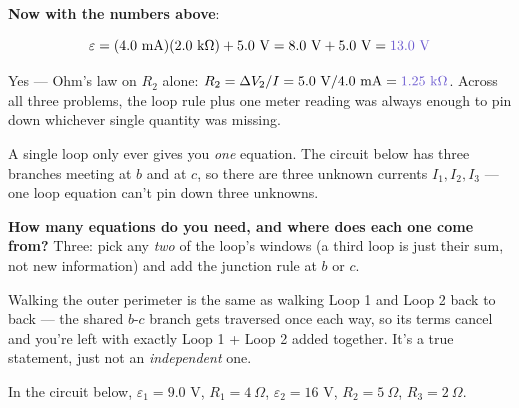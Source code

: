 \documentclass[12pt]{article}
\newcommand{\ANS}[1]{\textcolor{accent}{#1}}
\newcommand{\reszig}[1]{%
  \fill[white] ($(#1)+(-0.65,-0.32)$) rectangle ($(#1)+(0.65,0.32)$);
  \draw ($(#1)+(-0.6,0)$)
    -- ($(#1)+(-0.42,0.22)$) -- ($(#1)+(-0.24,-0.22)$)
    -- ($(#1)+(-0.06,0.22)$) -- ($(#1)+(0.12,-0.22)$)
    -- ($(#1)+(0.3,0.22)$) -- ($(#1)+(0.48,-0.22)$)
    -- ($(#1)+(0.6,0)$);
}
\newcommand{\batthL}[1]{%
  \draw[line width=0.7pt] ($(#1)+(-0.55,0)$) -- ($(#1)+(-0.12,0)$);
  \draw[line width=0.7pt] ($(#1)+(0.12,0)$) -- ($(#1)+(0.55,0)$);
  \draw[line width=1.1pt] ($(#1)+(-0.12,-0.35)$) -- ($(#1)+(-0.12,0.35)$);
  \draw[line width=2.4pt] ($(#1)+(0.12,-0.2)$) -- ($(#1)+(0.12,0.2)$);
  \node[scale=0.75] at ($(#1)+(-0.12,0.55)$) {$+$};
  \node[scale=0.75] at ($(#1)+(0.12,0.55)$) {$-$};
}
\newcommand{\batthR}[1]{%
  \draw[line width=0.7pt] ($(#1)+(-0.55,0)$) -- ($(#1)+(-0.12,0)$);
  \draw[line width=0.7pt] ($(#1)+(0.12,0)$) -- ($(#1)+(0.55,0)$);
  \draw[line width=2.4pt] ($(#1)+(-0.12,-0.2)$) -- ($(#1)+(-0.12,0.2)$);
  \draw[line width=1.1pt] ($(#1)+(0.12,-0.35)$) -- ($(#1)+(0.12,0.35)$);
  \node[scale=0.75] at ($(#1)+(-0.12,0.55)$) {$-$};
  \node[scale=0.75] at ($(#1)+(0.12,0.55)$) {$+$};
}
\newcommand{\reszigv}[1]{%
  \fill[white] ($(#1)+(-0.32,-0.65)$) rectangle ($(#1)+(0.32,0.65)$);
  \draw ($(#1)+(0,-0.6)$)
    -- ($(#1)+(0.22,-0.42)$) -- ($(#1)+(-0.22,-0.24)$)
    -- ($(#1)+(0.22,-0.06)$) -- ($(#1)+(-0.22,0.12)$)
    -- ($(#1)+(0.22,0.3)$) -- ($(#1)+(-0.22,0.48)$)
    -- ($(#1)+(0,0.6)$);
}
\newcommand{\twoloopdots}{%
  \filldraw (0,4) circle (1.5pt); \node[scale=0.8, anchor=south east] at (-0.05,4.05) {$e$};
  \filldraw (6,4) circle (1.5pt); \node[scale=0.8, anchor=south west] at (6.05,4.05) {$f$};
  \filldraw (0,2) circle (1.5pt); \node[scale=0.8, anchor=east] at (-0.1,2) {$b$};
  \filldraw (6,2) circle (1.5pt); \node[scale=0.8, anchor=west] at (6.1,2) {$c$};
  \filldraw (0,0) circle (1.5pt); \node[scale=0.8, anchor=north east] at (-0.05,-0.05) {$a$};
  \filldraw (6,0) circle (1.5pt); \node[scale=0.8, anchor=north west] at (6.05,-0.05) {$d$};
}
\begin{document}
\textbf{Now with the numbers above}:

\[
\varepsilon = (4.0\text{ mA})(2.0\text{ k}\Omega) + 5.0\text{ V}
= 8.0\text{ V} + 5.0\text{ V} = \ANS{13.0\text{ V}}
\]


{\small\color{accent} Yes --- Ohm's law on $R_2$ alone: $R_2=\Delta
V_2/I=5.0\text{ V}/4.0\text{ mA}=\ANS{1.25\text{ k}\Omega}$. Across all
three problems, the loop rule plus one meter reading was always enough to
pin down whichever single quantity was missing.}


A single loop only ever gives you \emph{one} equation. The circuit below
has three branches meeting at $b$ and at $c$, so there are three unknown
currents $I_1,I_2,I_3$ --- one loop equation can't pin down three unknowns.

\textbf{How many equations do you need, and where does each one come
from?} \ANS{Three: pick any \emph{two} of the loop's windows (a third loop
is just their sum, not new information) and add the junction rule at $b$
or $c$.}


{\small\color{accent} Walking the outer perimeter is the same as walking
Loop 1 and Loop 2 back to back --- the shared $b$-$c$ branch gets traversed
once each way, so its terms cancel and you're left with exactly Loop 1 +
Loop 2 added together. It's a true statement, just not an \emph{independent}
one.}


In the circuit below, $\varepsilon_1=9.0$ V, $R_1=4\ \Omega$,
$\varepsilon_2=16$ V, $R_2=5\ \Omega$, $R_3=2\ \Omega$.

\begin{center}
\end{center}
\end{document}
